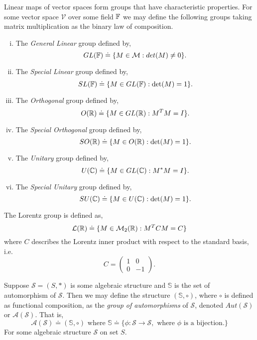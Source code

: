 \begin{exmp}
	Linear maps of vector spaces form groups that have characteristic properties. For some
	vector space $\mathcal{V}$ over some field $\mathbb{F}$ we may define the following groups taking
	matrix multiplication as the binary law of composition.
	\begin{enumerate}[i.)]
		\item The \emph{General Linear} group defined by,
			\[
				GL(\mathbb{F}) \doteq \{ M \in \mathcal{M} : det(M) \neq 0 \}.
			\]
		\item The \emph{Special Linear} group defined by,
			\[
				SL(\mathbb{F}) \doteq \{ M \in GL(\mathbb{F}) : \det(M) = 1 \}.
			\]
		\item The \emph{Orthogonal} group defined by,
			\[
				O(\mathbb{R}) \doteq \{ M \in GL(\mathbb{R}) : M^{T} M = I \}.
			\]
		\item The \emph{Special Orthogonal} group defined by,
			\[
				SO(\mathbb{R}) \doteq \{ M \in O(\mathbb{R}) : \det(M) = 1 \}.
			\]
		\item The \emph{Unitary} group defined by,
			\[
				U(\mathbb{C}) \doteq \{ M \in GL(\mathbb{C}) : M^{*} M = I \}.
			\]
		\item The \emph{Special Unitary} group defined by,
			\[
				SU(\mathbb{C}) \doteq \{ M \in U(\mathbb{C}) : \det(M) = 1 \}.
			\]
	\end{enumerate}
\end{exmp}

\begin{exmp}
	The Lorentz group is defined as,
	\[
		\mathcal{L}(\mathbb{R}) \doteq
		\{ M \in \mathcal{M}_{2}(\mathbb{R}) : M^{T} C M = C \}
	\]
	where $C$ describes the Lorentz inner product with respect to the
	standard basis, i.e.
	\[
		C =
		\begin{pmatrix}
			1 & 0 \\
			0 & -1
		\end{pmatrix}.
	\]
\end{exmp}

\begin{defn}
	Suppose $\mathcal{S}=(S,*)$ is some algebraic structure and $\mathbb{S}$ is the set
	of automorphism of $\mathcal{S}$. Then we may define the structure $(\mathbb{S}, \circ)$,
	where $\circ$ is defined as functional composition, as the \emph{group of automorphisms}
	of $\mathcal{S}$, denoted $Aut(\mathcal{S})$ or $\mathscr{A}(\mathcal{S})$. That is,
	\[
		\mathscr{A}(\mathcal{S}) \doteq (\mathbb{S}, \circ) \text{ where }
		\mathbb{S} \doteq
		\{ \phi : \mathcal{S} \to \mathcal{S}, \text{ where } \phi \text{ is a bijection}. \}
	\]
	For some algebraic structure $\mathcal{S}$ on set $S$.
\end{defn}


